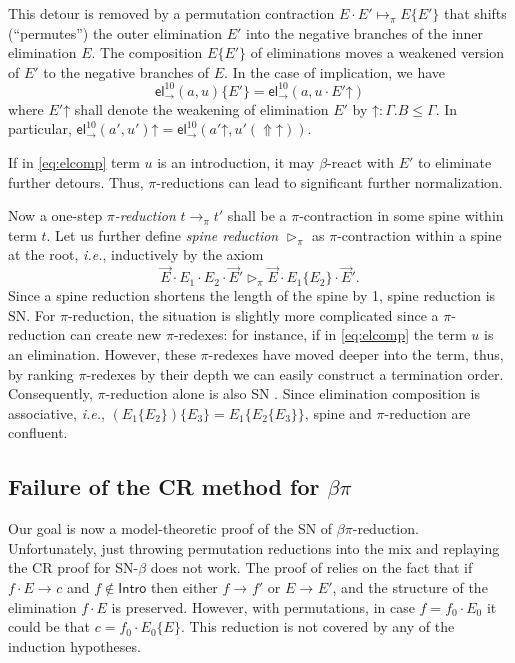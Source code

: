 \documentclass[a4paper,USenglish,cleveref, autoref, thm-restate]{lipics-v2019}
\newcommand{\ie}{\emph{i.e.}\xspace}
\newcommand{\tel}{\mathsf{el}}
\newcommand{\el}[2]{\ensuremath{\tel_{#1}^{#2}}}
\newcommand{\contract}[1][]{\mapsto_{#1}}
\newcommand{\whd}[1][]{\rhd_{#1}}
\newcommand{\red}[1][]{\longrightarrow_{#1}}
\newcommand{\Intro}{\mathsf{Intro}}
\newcommand{\Up}{\mathop{\Uparrow}}
\newcommand{\up}{\mathord{\uparrow}}
\begin{document}
This detour is removed by a permutation contraction
$E \cdot E' \contract[\pi] E\{E'\}$ that shifts (``permutes'')
the outer elimination
$E'$ into the negative branches of the inner elimination $E$.
The composition $E\{E'\}$ of eliminations moves a weakened
version of $E'$ to the negative branches of $E$.  In the case of
implication, we have
\begin{equation}
  \label{eq:elcomp}
  \el\to{10}(a,u) \{ E' \} = \el\to{10}(a,u \cdot E' \up)
\end{equation}
where
$E' \up$ shall denote the weakening of elimination $E'$ by
$\up : \Gamma.B \leq \Gamma$.
In particular, $\el\to{10}(a',u') \up = \el\to{10}(a' \up, u' (\Up\up))$.

\begin{remark}
  If in \cref{eq:elcomp} term $u$ is an introduction, it may $\beta$-react
  with $E'$ to eliminate further detours.  Thus, $\pi$-reductions can
  lead to significant further normalization.
\end{remark}

Now a one-step \emph{$\pi$-reduction} $t \red[\pi] t'$ shall be a
$\pi$-contraction in some spine within term $t$.
%
Let us further define \emph{spine reduction} $\whd[\pi]$
as $\pi$-contraction within a spine at the root, \ie, inductively
by the axiom
\[
  \vec E \cdot E_1 \cdot E_2 \cdot \vec E'
  \whd[\pi]
 \vec E \cdot E_1\{E_2\} \cdot \vec E'
 .
\]
Since a spine reduction shortens the length
of the spine by 1, spine reduction is SN.  For $\pi$-reduction, the
situation is slightly more complicated since a $\pi$-reduction can
create new $\pi$-redexes: for instance, if in \cref{eq:elcomp} the
term $u$ is an elimination.  However, these $\pi$-redexes have moved
deeper into the term, thus, by ranking $\pi$-redexes by their depth we
can easily construct a termination order.  Consequently,
$\pi$-reduction alone is also SN \cite[Thm.~55]{geuversHurkens:types17}.
%
Since elimination composition is associative, \ie,
$(E_1\{E_2\})\{E_3\} = E_1\{E_2\{E_3\}\}$, spine and $\pi$-reduction
are confluent.

\subsection{Failure of the CR method for $\beta\pi$}

Our goal is now a model-theoretic proof of the SN of $\beta\pi$-reduction.
Unfortunately,
just throwing permutation reductions into the mix and replaying the CR
proof for SN-$\beta$ does not work.  The proof of  relies
on the fact that if $f \cdot E \red c$ and $f \not\in \Intro$ then
either $f \red f'$ or $E \red E'$, and the structure of the
elimination $f \cdot E$ is preserved.  However, with permutations, in
case $f = f_0 \cdot E_0$ it could be that $c = f_0 \cdot E_0\{E\}$.
This reduction is not covered by any of the induction hypotheses.
\end{document}
